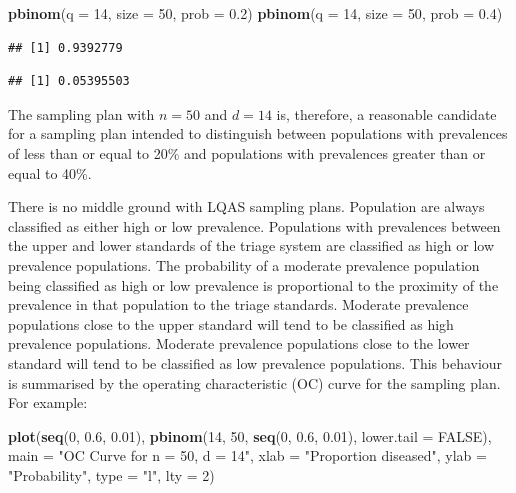 \documentclass[12pt,a4paper]{book}
\newenvironment{Shaded}{\begin{snugshade}}{\end{snugshade}}
\newcommand{\KeywordTok}[1]{\textcolor[rgb]{0.13,0.29,0.53}{\textbf{#1}}}
\newcommand{\DataTypeTok}[1]{\textcolor[rgb]{0.13,0.29,0.53}{#1}}
\newcommand{\DecValTok}[1]{\textcolor[rgb]{0.00,0.00,0.81}{#1}}
\newcommand{\FloatTok}[1]{\textcolor[rgb]{0.00,0.00,0.81}{#1}}
\newcommand{\StringTok}[1]{\textcolor[rgb]{0.31,0.60,0.02}{#1}}
\newcommand{\OtherTok}[1]{\textcolor[rgb]{0.56,0.35,0.01}{#1}}
\newcommand{\NormalTok}[1]{#1}
\theoremstyle{definition}
\theoremstyle{definition}
\theoremstyle{definition}
\theoremstyle{remark}
\begin{document}
\begin{Shaded}
\begin{Highlighting}[]
\KeywordTok{pbinom}\NormalTok{(}\DataTypeTok{q =} \DecValTok{14}\NormalTok{, }\DataTypeTok{size =} \DecValTok{50}\NormalTok{, }\DataTypeTok{prob =} \FloatTok{0.2}\NormalTok{)}
\KeywordTok{pbinom}\NormalTok{(}\DataTypeTok{q =} \DecValTok{14}\NormalTok{, }\DataTypeTok{size =} \DecValTok{50}\NormalTok{, }\DataTypeTok{prob =} \FloatTok{0.4}\NormalTok{)}
\end{Highlighting}
\end{Shaded}

\begin{verbatim}
## [1] 0.9392779
\end{verbatim}

\begin{verbatim}
## [1] 0.05395503
\end{verbatim}

The sampling plan with \(n = 50\) and \(d = 14\) is, therefore, a
reasonable candidate for a sampling plan intended to distinguish between
populations with prevalences of less than or equal to 20\% and
populations with prevalences greater than or equal to 40\%.

There is no middle ground with LQAS sampling plans. Population are
always classified as either high or low prevalence. Populations with
prevalences between the upper and lower standards of the triage system
are classified as high or low prevalence populations. The probability of
a moderate prevalence population being classified as high or low
prevalence is proportional to the proximity of the prevalence in that
population to the triage standards. Moderate prevalence populations
close to the upper standard will tend to be classified as high
prevalence populations. Moderate prevalence populations close to the
lower standard will tend to be classified as low prevalence populations.
This behaviour is summarised by the operating characteristic (OC) curve
for the sampling plan. For example:

\begin{Shaded}
\begin{Highlighting}[]
\KeywordTok{plot}\NormalTok{(}\KeywordTok{seq}\NormalTok{(}\DecValTok{0}\NormalTok{, }\FloatTok{0.6}\NormalTok{, }\FloatTok{0.01}\NormalTok{),}
     \KeywordTok{pbinom}\NormalTok{(}\DecValTok{14}\NormalTok{, }\DecValTok{50}\NormalTok{, }\KeywordTok{seq}\NormalTok{(}\DecValTok{0}\NormalTok{, }\FloatTok{0.6}\NormalTok{, }\FloatTok{0.01}\NormalTok{), }\DataTypeTok{lower.tail =} \OtherTok{FALSE}\NormalTok{),}
     \DataTypeTok{main =} \StringTok{"OC Curve for n = 50, d = 14"}\NormalTok{,}
     \DataTypeTok{xlab =} \StringTok{"Proportion diseased"}\NormalTok{,}
     \DataTypeTok{ylab =} \StringTok{"Probability"}\NormalTok{,}
     \DataTypeTok{type =} \StringTok{"l"}\NormalTok{, }\DataTypeTok{lty =} \DecValTok{2}\NormalTok{)}
\end{Highlighting}
\end{Shaded}
\end{document}
